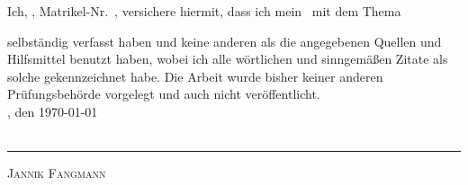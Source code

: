 \label{sec:Eidestattliche Erklaerung}

Ich, \autor, Matrikel-Nr.\ \matrikelnr, versichere hiermit, dass ich mein
\art \ mit dem Thema
\begin{quote}
\textit{\untertitel}
\end{quote}
selbständig verfasst haben und keine anderen als die angegebenen Quellen und
Hilfsmittel benutzt haben, wobei ich alle wörtlichen und sinngemäßen Zitate als
solche gekennzeichnet habe. Die Arbeit wurde bisher keiner anderen
Prüfungsbehörde vorgelegt und auch nicht veröffentlicht.\\[6ex]

\ort, den \today
\\
\\
\rule[-0.2cm]{5cm}{0.5pt}

\textsc{Jannik Fangmann} 

